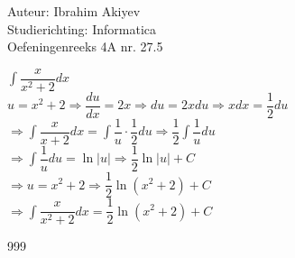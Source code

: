\documentclass[a4paper]{article}
\begin{document}
\noindent \large Auteur: Ibrahim Akiyev \\
\noindent \large Studierichting: Informatica\\
\noindent \large Oefeningenreeks 4A nr. 27.5\\

\medskip

\normalsize

$\displaystyle \int\dfrac{x}{x^2 + 2}dx$\\

$u = x^2 + 2 \Rightarrow \dfrac{du}{dx} = 2x \Rightarrow du = 2xdu \Rightarrow xdx = \dfrac{1}{2}du$\\

$\Rightarrow \displaystyle \int \dfrac{x}{x+2}dx = \int \dfrac{1}{u} \cdot \dfrac{1}{2} du \Rightarrow \dfrac {1}{2} \int \dfrac{1}{u}du $\\

$\Rightarrow \displaystyle \int \dfrac{1}{u}du = \ln\left|u\right| \Rightarrow \dfrac{1}{2}\ln\left|u\right| + C$\\

$\Rightarrow u = x^2 +2 \Rightarrow \dfrac{1}{2}\ln(x^2+2)+C$\\

$\Rightarrow \displaystyle \int \dfrac{x}{x^2+2}dx = \dfrac{1}{2}\ln(x^2+2)+C$\\

\begin{thebibliography}{999}
\end{thebibliography}
\end{document}
